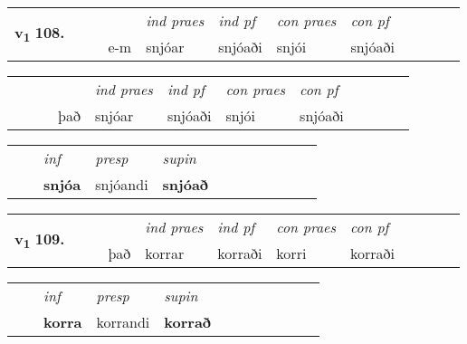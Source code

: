 \begin{tabular}{llllllllllll}\toprule
\multirow{4}{*}{{{\textbf{v{\textsubscript{1}}} \Large{\textbf{108.}}}}}  & &  & &  \textit{ind praes} & \textit{ind pf} & \textit{con praes} & \textit{con pf} \\*
&  & & e-m & snjóar & snjóaði & snjói & snjóaði \\*
\cmidrule{5-9}
\end{tabular}


\begin{tabular}{llllllllllll}
 & &  & &  \textit{ind praes} & \textit{ind pf} & \textit{con praes} & \textit{con pf} \\*
&  & & það & snjóar & snjóaði & snjói & snjóaði \\*
\cmidrule{5-9}
\end{tabular}


\begin{tabular}{llllllllllll}
 & & \textit{inf}     & \textit{presp} & \textit{supin}       \\*
  & & \textbf{snjóa}      & snjóandi &  \textbf{snjóað}   \\*
\cmidrule{1-12}
\end{tabular}





\begin{tabular}{llllllllllll}\toprule
\multirow{4}{*}{{{\textbf{v{\textsubscript{1}}} \Large{\textbf{109.}}}}}  & &  & &  \textit{ind praes} & \textit{ind pf} & \textit{con praes} & \textit{con pf} \\*
&  & & það & korrar & korraði & korri & korraði \\*
\cmidrule{5-9}
\end{tabular}


\begin{tabular}{llllllllllll}
 & & \textit{inf}     & \textit{presp} & \textit{supin}       \\*
  & & \textbf{korra}      & korrandi &  \textbf{korrað}   \\*
\cmidrule{1-12}
\end{tabular}



